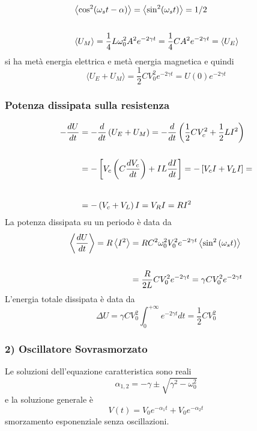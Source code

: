 \begin{equation*}
\begin{aligned}
& \left\langle\cos ^2(\omega_s t-\alpha)\right\rangle = \left\langle\sin ^2 (\omega_s t )\right\rangle=1 / 2 \\ \rule{0pt}{30pt}
& \left\langle U_M\right\rangle=\frac{1}{4} L \omega_0^2 A^2 e^{-2 \gamma t}=\frac{1}{4} C A^2 e^{-2 \gamma t}=\left\langle U_E\right\rangle
\end{aligned}
\end{equation*}
si ha met\`a energia elettrica e met\`a energia magnetica e quindi 
\begin{equation*}
	\langle U_E + U_M \rangle = \frac{1}{2}C V_0^2e^{-2 \gamma t} = U(0) e^{-2 \gamma t}
\end{equation*}

\subsubsection{Potenza dissipata sulla resistenza}

\begin{equation*}
\begin{aligned}
-\frac{d U}{d t} & =-\frac{d}{d t}\left(U_E+U_M\right)=-\frac{d}{d t}\left(\frac{1}{2} C V_c^2+\frac{1}{2} L I^2\right) \\ \rule{0pt}{30pt}
& =-\left[V_c\left(C \frac{d V_c}{d t}\right)+I L\frac{d I}{d t}\right]=-\left[V_c I+V_L I\right]= \\ \rule{0pt}{30pt}
& =-\left(V_c+V_L\right) I=V_R I=R I^2
\end{aligned}
\end{equation*}
La potenza dissipata su un periodo \`e data da
\begin{equation*}
\begin{aligned}
\left\langle\frac{d U}{d t}\right\rangle=R\left\langle I^2\right\rangle & =R C^2 \omega_0^2 V_0^2 e^{-2 \gamma t}\left\langle\sin ^2\left(\omega_s t\right)\right\rangle \\ \rule{0pt}{30pt}
& =\frac{R}{2 L} CV_0^2 e^{-2 \gamma t}=\gamma C V_0^2 e^{-2 \gamma t}
\end{aligned}
\end{equation*}
L'energia totale dissipata \`e data da
\begin{equation*}
	\Delta U = \gamma C V_0^2 \int_{0}^{+ \infty} e^{-2 \gamma t}dt = \frac{1}{2}CV_0^2
\end{equation*}

\subsubsection{2) Oscillatore Sovrasmorzato}
Le soluzioni dell'equazione caratteristica sono reali 
\begin{equation*}
	\alpha_{1,2} = - \gamma \pm \sqrt{\gamma^2 - \omega_0^2}
\end{equation*}
e la soluzione generale \`e 
\begin{equation*}
	V(t) = V_0 e^{-\alpha_1 t} + V_0 e^{- \alpha_2 t}
\end{equation*}
smorzamento esponenziale senza oscillazioni.

